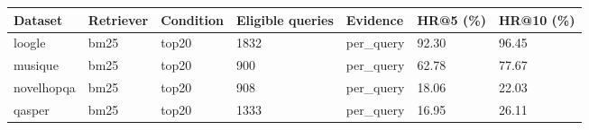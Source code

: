 \begin{tabular}{lllllll}
\hline
Dataset & Retriever & Condition & Eligible queries & Evidence & HR@5 (\%) & HR@10 (\%) \\
\hline
loogle & bm25 & top20 & 1832 & per\_query & 92.30 & 96.45 \\
musique & bm25 & top20 & 900 & per\_query & 62.78 & 77.67 \\
novelhopqa & bm25 & top20 & 908 & per\_query & 18.06 & 22.03 \\
qasper & bm25 & top20 & 1333 & per\_query & 16.95 & 26.11 \\
\hline
\end{tabular}
